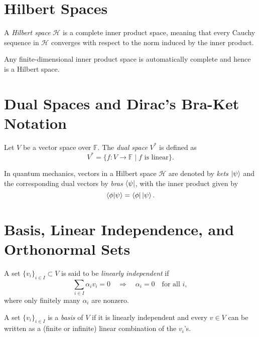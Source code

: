 	\section{Hilbert Spaces}
	\begin{definition}
		A \emph{Hilbert space} \( \mathcal{H} \) is a complete inner product space, meaning that every Cauchy sequence in \( \mathcal{H} \) converges with respect to the norm induced by the inner product.
	\end{definition}
	
	\begin{remark}
		Any finite-dimensional inner product space is automatically complete and hence is a Hilbert space.
	\end{remark}
	
	\section{Dual Spaces and Dirac's Bra-Ket Notation}
	\begin{definition}
		Let \( V \) be a vector space over \( \mathbb{F} \). The \emph{dual space} \( V^* \) is defined as
		\[
		V^* = \{ f: V \to \mathbb{F} \mid f \text{ is linear} \}.
		\]
	\end{definition}
	
	In quantum mechanics, vectors in a Hilbert space \( \mathcal{H} \) are denoted by \emph{kets} \( \left| \psi \right\rangle \) and the corresponding dual vectors by \emph{bras} \( \left\langle \psi \right| \), with the inner product given by
	\[
	\left\langle \phi \middle| \psi \right\rangle = \left\langle \phi \right|\left| \psi \right\rangle.
	\]
	
	\section{Basis, Linear Independence, and Orthonormal Sets}
	\begin{definition}
		A set \( \{v_i\}_{i \in I} \subset V \) is said to be \emph{linearly independent} if
		\[
		\sum_{i\in I} \alpha_i v_i = 0 \quad \Longrightarrow \quad \alpha_i = 0 \quad \text{for all } i,
		\]
		where only finitely many \( \alpha_i \) are nonzero.
	\end{definition}
	
	\begin{definition}[Basis]
		A set \( \{v_i\}_{i \in I} \) is a \emph{basis} of \( V \) if it is linearly independent and every \( v \in V \) can be written as a (finite or infinite) linear combination of the \( v_i \)'s.
	\end{definition}
	
